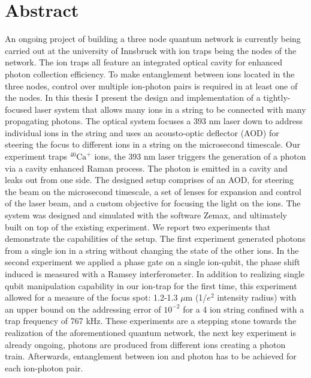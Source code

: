 \documentclass[english, a4paper, 12pt, twoside]{book}
\numberwithin{equation}{section} %
\begin{document}
{

}
\restoregeometry %

\thispagestyle{plain} %
\clearpage\mbox{}\clearpage %

\newpage

\section*{Abstract}
An ongoing project of building a three node quantum network is currently being carried out at the university of Innsbruck with ion traps being the nodes of the network. The ion traps all feature an integrated optical cavity for enhanced photon collection efficiency. To make entanglement between ions located in the three nodes, control over multiple ion-photon pairs is required in at least one of the nodes. In this thesis I present the design and implementation of a tightly-focused laser system that allows many ions in a string to be connected with many propagating photons. The optical system focuses a 393 nm laser down to address individual ions in the string and uses an acousto-optic deflector (AOD) for steering the focus to different ions in a string on the microsecond timescale. Our experiment traps $^{40}\text{Ca}^+$ ions, the 393 nm laser triggers the generation of a photon via a cavity enhanced Raman process. The photon is emitted in a cavity and leaks out from one side.
The designed setup comprises of an AOD, for steering the beam on the microsecond timescale, a set of lenses for expansion and control of the laser beam, and a custom objective for focusing the light on the ions. The system was designed and simulated with the software Zemax, and ultimately built on top of the existing experiment. We report two experiments that demonstrate the capabilities of the setup. The first experiment generated photons from a single ion in a string without changing the state of the other ions. In the second experiment we applied a phase gate on a single ion-qubit, the phase shift induced is measured with a Ramsey interferometer. In addition to realizing single qubit manipulation capability in our ion-trap for the first time, this experiment allowed for a measure of the focus spot: 1.2-1.3 $\mu$m (1/$e^2$ intensity radius) with an upper bound on the addressing error of $10^{-2}$ for a 4 ion string confined with a trap frequency of 767 kHz. These experiments are a stepping stone towards the realization of the aforementioned quantum network, the next key experiment is already ongoing, photons are produced from different ions creating a photon train. Afterwards, entanglement between ion and photon has to be achieved for each ion-photon pair.
\newpage
\end{document}
